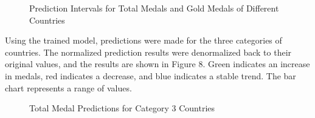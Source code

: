 \documentclass{mcmthesis}
\begin{document}
\begin{figure}[H]
    
    \begin{minipage}{1\linewidth}
        \hfill %
    \end{minipage}
    
    \caption{Prediction Intervals for Total Medals and Gold Medals of Different Countries} \label{fig:8-11}
\end{figure}

Using the trained model, predictions were made for the three categories of countries. The normalized prediction results were denormalized back to their original values, and the results are shown in Figure 8. Green indicates an increase in medals, red indicates a decrease, and blue indicates a stable trend. The bar chart represents a range of values.

\begin{figure}[H]
	\centering
	\caption{Total Medal Predictions for Category 3 Countries}
	\label{fig_E1}
\end{figure}
\end{document}
